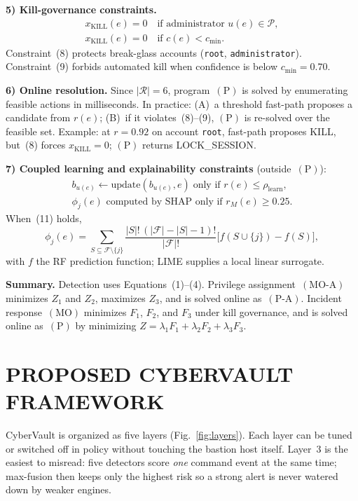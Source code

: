 \documentclass{ieeeaccess}
\begin{document}
\textbf{5) Kill-governance constraints.}
\begin{align}
&x_{\mathrm{KILL}}(e)=0 \quad \text{if administrator } u(e)\in\mathcal{P},
&\tag{8}\\
&x_{\mathrm{KILL}}(e)=0 \quad \text{if } c(e)<c_{\min}.
&\tag{9}
\end{align}
Constraint~(8) protects break-glass accounts (\texttt{root}, \texttt{administrator}). Constraint~(9) forbids automated kill when confidence is below $c_{\min}{=}0.70$.

\textbf{6) Online resolution.}
Since $|\mathcal{R}|=6$, program~$(\mathrm{P})$ is solved by enumerating feasible actions in milliseconds. In practice: (A)~a threshold fast-path proposes a candidate from $r(e)$; (B)~if it violates~(8)--(9), $(\mathrm{P})$ is re-solved over the feasible set. Example: at $r{=}0.92$ on account \texttt{root}, fast-path proposes KILL, but~(8) forces $x_{\mathrm{KILL}}=0$; $(\mathrm{P})$ returns LOCK\_SESSION.

\textbf{7) Coupled learning and explainability constraints} (outside~$(\mathrm{P})$):
\begin{align}
&b_{u(e)} \leftarrow \text{update}(b_{u(e)},e) \;\text{only if } r(e)\leq\rho_{\mathrm{learn}},
&\tag{10}\\
&\phi_j(e) \text{ computed by SHAP only if } r_M(e)\geq 0.25.
&\tag{11}
\end{align}
When~(11) holds,
\begin{equation}
\phi_j(e)=\sum_{S\subseteq\mathcal{F}\setminus\{j\}} \frac{|S|!\,(|\mathcal{F}|-|S|-1)!}{|\mathcal{F}|!}\bigl[f(S\cup\{j\})-f(S)\bigr],
\tag{12}
\end{equation}
with $f$ the RF prediction function; LIME supplies a local linear surrogate.

\textbf{Summary.}
Detection uses Equations~(1)--(4). Privilege assignment~$(\mathrm{MO}\text{-}\mathrm{A})$ minimizes $Z_1$ and $Z_2$, maximizes $Z_3$, and is solved online as~$(\mathrm{P}\text{-}\mathrm{A})$. Incident response~$(\mathrm{MO})$ minimizes $F_1$, $F_2$, and $F_3$ under kill governance, and is solved online as~$(\mathrm{P})$ by minimizing $Z=\lambda_1 F_1+\lambda_2 F_2+\lambda_3 F_3$.

\section{PROPOSED CYBERVAULT FRAMEWORK}
\label{sec:framework}

CyberVault is organized as five layers (Fig.~\ref{fig:layers}). Each layer can be tuned or switched off in policy without touching the bastion host itself. Layer~3 is the easiest to misread: five detectors score \emph{one} command event at the same time; max-fusion then keeps only the highest risk so a strong alert is never watered down by weaker engines.
\end{document}
